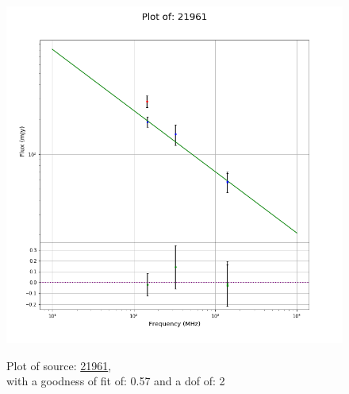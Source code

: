 \documentclass{article}
\begin{document}
\begin{figure}[H]
\begin{minipage}{0.5\textwidth}
        \includegraphics[scale = 0.35]{KmeulenTrap4P23_1min/1min21961.png}
        \captionsetup{labelformat=empty}
        \caption{Plot of source: \href{http://banana.transientskp.org/r4/vlo_KmeulenTrap4P23/runningcatalog/21961}{21961},\\with a goodness of fit of: 0.57 and a dof of: 2}
    \addtocounter{figure}{-1}
    \label{KmeulenTrap4P23:1min:21961:plot}
    \end{minipage}
\end{figure}
\end{document}
